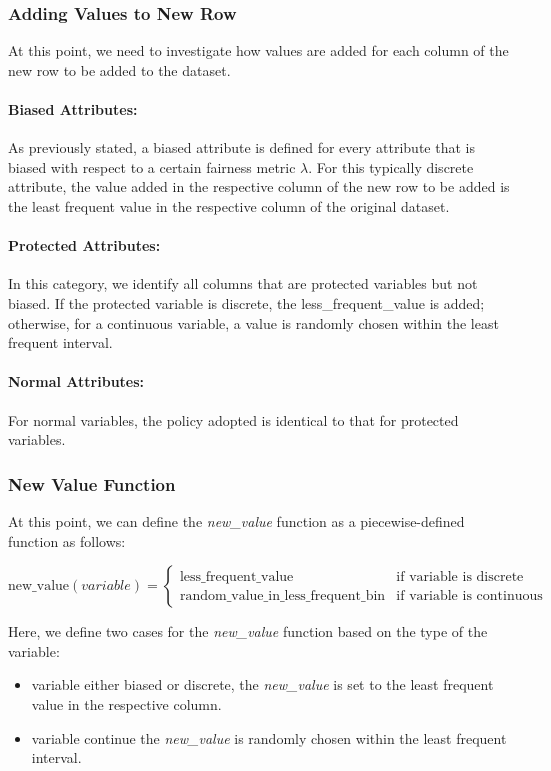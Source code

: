 \documentclass[12pt,a4paper,openright,twoside]{book}
\begin{document}
\subsubsection{Adding Values to New Row}
At this point, we need to investigate how values are added for each column of the new row to be added to the dataset.

\paragraph{Biased Attributes:}
As previously stated, a biased attribute is defined for every attribute that is biased with respect to a certain fairness metric \( \lambda \). For this typically discrete attribute, the value added in the respective column of the new row to be added is the least frequent value in the respective column of the original dataset.

\paragraph{Protected Attributes:}
In this category, we identify all columns that are protected variables but not biased. If the protected variable is discrete, the less\_frequent\_value is added; otherwise, for a continuous variable, a value is randomly chosen within the least frequent interval.

\paragraph{Normal Attributes:}
For normal variables, the policy adopted is identical to that for protected variables.

\subsubsection{New Value Function}
At this point, we can define the \textit{new\_value} function as a piecewise-defined function as follows:

\[
\text{new\_value}(variable) = 
\begin{cases} 
      \text{less\_frequent\_value} & \text{if } \text{variable} \text{ is discrete} \\
      \text{random\_value\_in\_less\_frequent\_bin} & \text{if } \text{variable} \text{ is  continuous}
\end{cases}
\]

Here, we define two cases for the \textit{new\_value} function based on the type of the variable:
\begin{itemize}
    \item variable either biased or discrete, the \textit{new\_value} is set to the least frequent value in the respective column.
    \item variable continue the \textit{new\_value} is randomly chosen within the least frequent interval.
\end{itemize}
\end{document}
